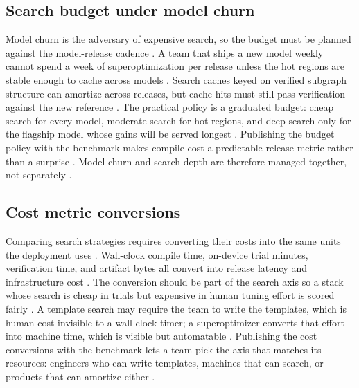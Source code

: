 \subsection{Search budget under model churn}

Model churn is the adversary of expensive search, so the budget must be planned against the model-release cadence \citep{wu2024mirage,kwon2023vllm,taxbreak2026}. A team that ships a new model weekly cannot spend a week of superoptimization per release unless the hot regions are stable enough to cache across models \citep{wu2024mirage,patel2025llminference}. Search caches keyed on verified subgraph structure can amortize across releases, but cache hits must still pass verification against the new reference \citep{wu2024mirage,memoryfloor2026}. The practical policy is a graduated budget: cheap search for every model, moderate search for hot regions, and deep search only for the flagship model whose gains will be served longest \citep{chen2020compilerbasedhardw,patel2025llminference}. Publishing the budget policy with the benchmark makes compile cost a predictable release metric rather than a surprise \citep{taxbreak2026,memoryfloor2026}. Model churn and search depth are therefore managed together, not separately \citep{wu2024mirage,kwon2023vllm}.

\subsection{Cost metric conversions}

Comparing search strategies requires converting their costs into the same units the deployment uses \citep{wu2024mirage,chen2018autotvm,patel2025llminference}. Wall-clock compile time, on-device trial minutes, verification time, and artifact bytes all convert into release latency and infrastructure cost \citep{taxbreak2026,memoryfloor2026}. The conversion should be part of the search axis so a stack whose search is cheap in trials but expensive in human tuning effort is scored fairly \citep{chen2018autotvm,wu2024mirage}. A template search may require the team to write the templates, which is human cost invisible to a wall-clock timer; a superoptimizer converts that effort into machine time, which is visible but automatable \citep{chen2018autotvm,wu2024mirage}. Publishing the cost conversions with the benchmark lets a team pick the axis that matches its resources: engineers who can write templates, machines that can search, or products that can amortize either \citep{patel2025llminference,memoryfloor2026}.

